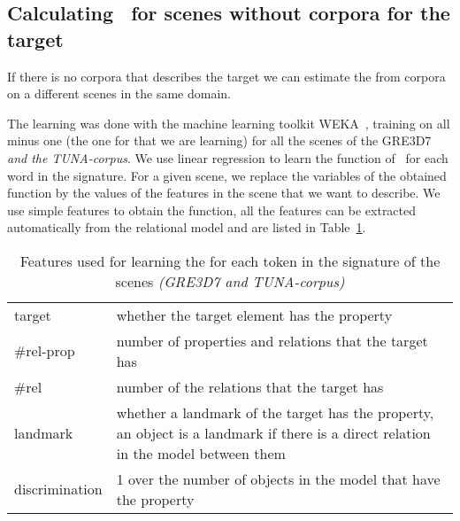 \subsection{Calculating \puse\ for scenes without corpora for the target} \label{subsec:learning}

If there is no corpora that describes the target we can estimate the \puse from corpora on a different scenes in the same domain. 


The learning was done with the machine learning toolkit WEKA~\cite{Hall:WEK09}, training on all minus one (the one for that we are learning) for all the scenes of the GRE3D7 \textit{and the TUNA-corpus}. We use linear regression to learn the function of \puse\ for each word in the signature. 
For a given scene, we replace the variables of the obtained function by the values of the features in the scene that we want to describe. 
We use simple features to obtain the function, all the features can be extracted automatically from the relational model and are listed 
in Table~\ref{features}.  

\begin{small}
\begin{table}[h!]
\begin{center}
\begin{tabular}{|l|p{10cm}|}
\hline
target & whether the target element has the property \\
\#rel-prop & number of properties and relations that the target has\\
\#rel & number of the relations that the target has \\
landmark & whether a landmark of the target has the property, an object is a landmark if there is a direct relation in the model 
between them \\
discrimination & 1 over the number of objects in the model that have the property \\
\hline
\end{tabular}
\caption{Features used for learning the \puse for each token in the signature of the scenes \textit{(GRE3D7 and TUNA-corpus)} \label{features}}
\end{center}
\end{table}
\end{small}

